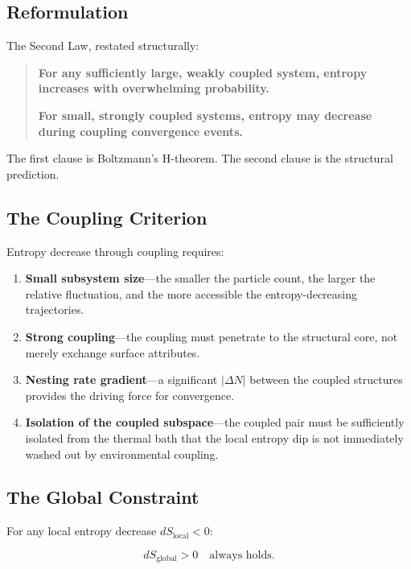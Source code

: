\documentclass[12pt,a4paper]{article}
\begin{document}
\subsection{Reformulation}

The Second Law, restated structurally:

\begin{quote}
\textbf{For any sufficiently large, weakly coupled system, entropy increases with overwhelming probability.}

\textbf{For small, strongly coupled systems, entropy may decrease during coupling convergence events.}
\end{quote}

The first clause is Boltzmann's H-theorem. The second clause is the structural prediction.

\subsection{The Coupling Criterion}

Entropy decrease through coupling requires:

\begin{enumerate}
    \item \textbf{Small subsystem size}---the smaller the particle count, the larger the relative fluctuation, and the more accessible the entropy-decreasing trajectories.
    \item \textbf{Strong coupling}---the coupling must penetrate to the structural core, not merely exchange surface attributes.
    \item \textbf{Nesting rate gradient}---a significant $|\Delta N|$ between the coupled structures provides the driving force for convergence.
    \item \textbf{Isolation of the coupled subspace}---the coupled pair must be sufficiently isolated from the thermal bath that the local entropy dip is not immediately washed out by environmental coupling.
\end{enumerate}

\subsection{The Global Constraint}

For any local entropy decrease $dS_\text{local} < 0$:

\begin{equation}
dS_\text{global} > 0 \quad \text{always holds.}
\end{equation}
\end{document}
